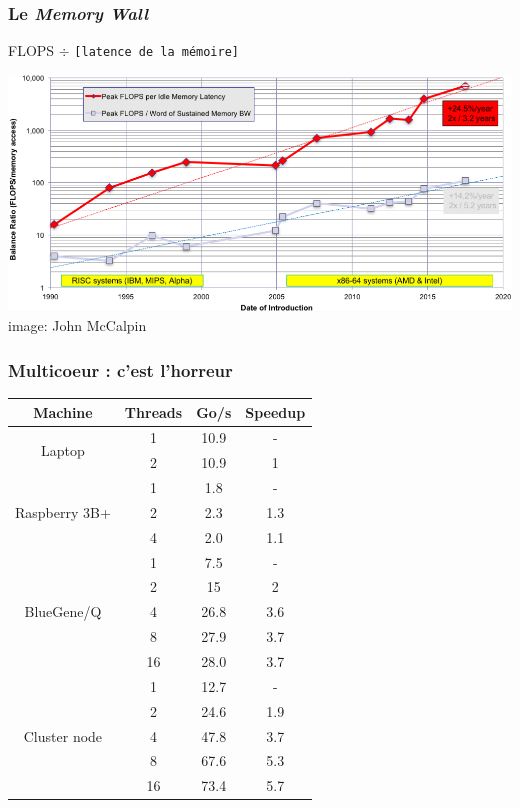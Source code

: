 \documentclass[xcolor={x11names,svgnames}, 14pt]{beamer}
\begin{document}
\begin{frame}
  \frametitle{Le \og \emph{Memory Wall}\fg{}}

  \begin{center}
    \large FLOPS $\div$ \texttt{[latence de la mémoire]}
  \end{center}

  \bigskip

  \includegraphics[width=\textwidth]{calpin_wall_latence.png}
    \flushright image: John McCalpin
\end{frame}


\begin{frame}
  \frametitle{Multicoeur : c'est l'horreur}

  \smallskip
  
  \small
  \centering
\begin{tabular}{|cc|c|c|}
  \hline
  Machine         & Threads & Go/s & Speedup \\
    \hline  \hline
  \multirow{2}{*}{Laptop}          & 1 & 10.9  & -\\
            & 2 & 10.9  & \alert{1} \\
  \hline
  \multirow{3}{*}{Raspberry 3B+}       & 1  & 1.8  & - \\
         & 2  & 2.3  & \alert{1.3} \\
         & 4  & 2.0  & \alert{1.1} \\
  \hline
  \multirow{5}{*}{BlueGene/Q}      & 1  & 7.5  & -\\ 
        & 2  & 15   & 2\\
        & 4  & 26.8 & 3.6 \\
        & 8  & 27.9 & \alert{3.7} \\
        & 16 & 28.0 & \alert{3.7} \\ 
  \hline
  \multirow{5}{*}{Cluster node}    & 1  & 12.7 & - \\
      & 2  & 24.6 & 1.9 \\
      & 4  & 47.8 & 3.7 \\
      & 8  & 67.6 & {\color{orange} 5.3} \\
      & 16 & 73.4 & \alert{5.7} \\
  \hline
\end{tabular}
\end{frame}
\end{document}
